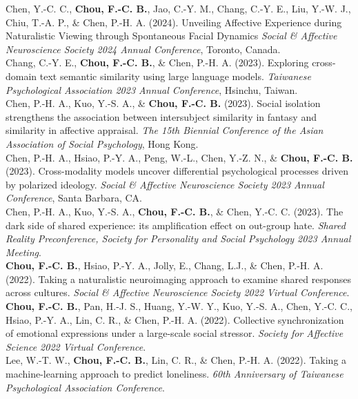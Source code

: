 \documentclass[a4paper,12pt]{article}
\newcommand{\itemspace}{7pt} %
\begin{document}
\noindent Chen, Y.-C. C., \textbf{Chou, F.-C. B.}, Jao, C.-Y. M., Chang, C.-Y. E., Liu, Y.-W. J., Chiu, T.-A. P., \& Chen, P.-H. A. (2024). Unveiling Affective Experience during Naturalistic Viewing through Spontaneous Facial Dynamics \textit{Social \& Affective Neuroscience Society 2024 Annual Conference}, Toronto, Canada. \\[\itemspace]
\noindent Chang, C.-Y. E., \textbf{Chou, F.-C. B.}, \& Chen, P.-H. A. (2023). Exploring cross-domain text semantic similarity using large language models. \textit{Taiwanese Psychological Association 2023 Annual Conference}, Hsinchu, Taiwan.\\[\itemspace]
\noindent Chen, P.-H. A., Kuo, Y.-S. A., \& \textbf{Chou, F.-C. B.} (2023). Social isolation strengthens the association between intersubject similarity in fantasy and similarity in affective appraisal. \textit{The 15th Biennial Conference of the Asian Association of Social Psychology}, Hong Kong.\\[\itemspace]
\noindent Chen, P.-H. A., Hsiao, P.-Y. A., Peng, W.-L., Chen, Y.-Z. N., \& \textbf{Chou, F.-C. B.} (2023). Cross-modality models uncover differential psychological processes driven by polarized ideology. \textit{Social \& Affective Neuroscience Society 2023 Annual Conference}, Santa Barbara, CA.\\[\itemspace]
\noindent Chen, P.-H. A., Kuo, Y.-S. A., \textbf{Chou, F.-C. B.}, \& Chen, Y.-C. C. (2023). The dark side of shared experience: its amplification effect on out-group hate. \textit{Shared Reality Preconference, Society for Personality and Social Psychology 2023 Annual Meeting}.\\[\itemspace]
\noindent \textbf{Chou, F.-C. B.}, Hsiao, P.-Y. A., Jolly, E., Chang, L.J., \& Chen, P.-H. A. (2022). Taking a naturalistic neuroimaging approach to examine shared responses across cultures. \textit{Social \& Affective Neuroscience Society 2022 Virtual Conference}.\\[\itemspace]
\noindent \textbf{Chou, F.-C. B.}, Pan, H.-J. S., Huang, Y.-W. Y., Kuo, Y.-S. A., Chen, Y.-C. C., Hsiao, P.-Y. A., Lin, C. R., \& Chen, P.-H. A. (2022). Collective synchronization of emotional expressions under a large-scale social stressor. \textit{Society for Affective Science 2022 Virtual Conference}.\\[\itemspace]
\noindent Lee, W.-T. W., \textbf{Chou, F.-C. B.}, Lin, C. R., \& Chen, P.-H. A. (2022). Taking a machine-learning approach to predict loneliness. \textit{60th Anniversary of Taiwanese Psychological Association Conference}.\\[\itemspace]
\end{document}
